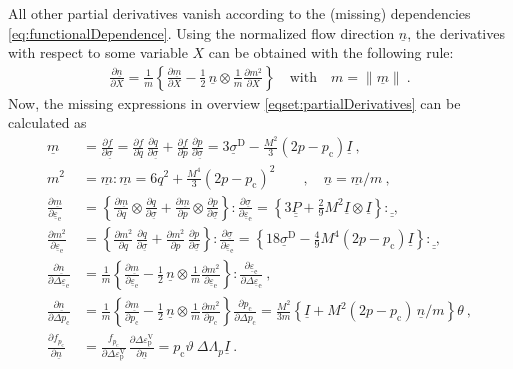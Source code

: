 \documentclass[paper=a4, twoside, pagesize]{scrartcl}
\newcommand{\tensor}[1]{\underline{#1}}
\newcommand{\tensorf}[1]{\underline{\underline{#1}}}
\newcommand{\D}{\text{D}}
\renewcommand{\c}{\text{c}}
\newcommand{\e}{\text{e}}
\newcommand{\p}{\text{p}}
\newcommand{\with}{\text{with}}
\newcommand{\dyad}{\otimes}
\begin{document}
All other partial derivatives vanish according to the (missing) dependencies \eqref{eq:functionalDependence}. Using the normalized flow direction $\tensor n$, the derivatives with respect to some variable $X$ can be obtained with the following rule:
\begin{align}
  \frac{\partial\tensor n}{\partial X} = \frac{1}{m}\left\{\frac{\partial\tensor m}{\partial X} - \frac{1}{2}\,\tensor n\dyad\frac{1}{m}\frac{\partial m^2}{\partial X} \right\}\quad\with\quad m=\|\tensor m\| \ .
\end{align}
Now, the missing expressions in overview \eqref{eqset:partialDerivatives} can be calculated as
\begin{subequations}
\begin{align}
  \tensor m &= \frac{\partial f}{\partial \tensor\sigma} = \frac{\partial f}{\partial q}\,\frac{\partial q}{\partial \tensor\sigma} +\frac{\partial f}{\partial p}\,\frac{\partial p}{\partial \tensor\sigma} 
  = 3\tensor\sigma^\D - \frac{M^2}{3}(2p-p_\c) \tensor I \ , 
  \\
  m^2 &= \tensor m : \tensor m = 6q^2 + \frac{M^4}{3}(2p-p_\c)^2 \qquad , \quad \tensor n = \tensor m/m \ , 
  \\
  \frac{\partial\tensor m}{\partial\tensor\varepsilon_\e} &= \left\{ \frac{\partial\tensor m}{\partial q}\dyad\frac{\partial q}{\partial \tensor\sigma} + \frac{\partial\tensor m}{\partial p}\dyad\frac{\partial p}{\partial \tensor\sigma} \right\} : \frac{\partial \tensor\sigma}{\partial \tensor\varepsilon_\e}
  = \left\{ 3\tensorf P + \frac{2}{9} M^2 \tensor I\dyad\tensor I \right\} : \tensorf \ , 
  \\
  \frac{\partial m^2}{\partial\tensor\varepsilon_\e} &= \left\{ \frac{\partial m^2}{\partial q}\,\frac{\partial q}{\partial \tensor\sigma} +\frac{\partial m^2}{\partial p}\,\frac{\partial p}{\partial \tensor\sigma} \right\} : \frac{\partial \tensor\sigma}{\partial \tensor\varepsilon_\e} 
  = \left\{ 18\tensor\sigma^\D - \frac{4}{9} M^4 (2p-p_\c)\tensor I \right\} : \tensorf \ , 
  \\
  \frac{\partial\tensor n}{\partial\varDelta\tensor\varepsilon_\e} &= 
  \frac{1}{m}\left\{\frac{\partial\tensor m}{\partial\tensor\varepsilon_\e} - \frac{1}{2}\,\tensor n\dyad\frac{1}{m}\frac{\partial m^2}{\partial\tensor\varepsilon_\e} \right\} :  
  \frac{\partial\tensor\varepsilon_\e}{\partial\varDelta\tensor\varepsilon_\e} \ ,
  \\
  \frac{\partial\tensor n}{\partial\varDelta p_\c} &= 
  \frac{1}{m}\left\{\frac{\partial\tensor m}{\partial p_\c} - \frac{1}{2}\,\tensor n\dyad\frac{1}{m}\frac{\partial m^2}{\partial p_\c} \right\} 
  \frac{\partial p_\c}{\partial\varDelta p_\c} = \frac{M^2}{3m}\left\{\tensor I + M^2(2p-p_\c)\,\tensor n/m \right\} \theta\ , 
  \\
  \frac{\partial f_{p_\c}}{\partial\tensor n} &= \frac{f_{p_\c}}{\partial\varDelta\varepsilon_\p^\text{V}}\, \frac{\partial\varDelta\varepsilon_\p^\text{V}}{\partial\tensor n} 
                                            = p_\c\vartheta\ \varDelta\varLambda_p \tensor I \ .
\end{align}
\end{subequations}
\end{document}
